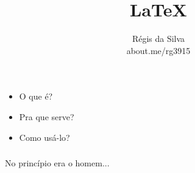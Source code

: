 \documentclass{beamer}
\title{\Huge \LaTeX}
\author{R\'egis da Silva\\ {\texorpdfstring{\color{blue}}{ }about.me/rg3915}}
\institute{\Large {\texorpdfstring{\color{blue}}{ }latexbr.blogspot.com.br}}
\date{}
\begin{document}
\justifying %

{%

  \begin{frame}
  \end{frame}
}

\begin{frame}\frametitle{}
\begin{itemize}
  \item<1-> \Huge O que é?
  \item<2-> \Huge Pra que serve?
  \item<3-> \Huge Como usá-lo?
\end{itemize}
\end{frame}

\begin{frame}\frametitle{}
  \begin{center}
    \Huge No princípio era o homem...
  \end{center}
\end{frame}

{%

  \begin{frame}
    \begin{center}
      \vspace{.7\paperheight}
      \huge \color{white}{E o homem era Donald Knuth.}
    \end{center}
  \end{frame}
}
\end{document}
